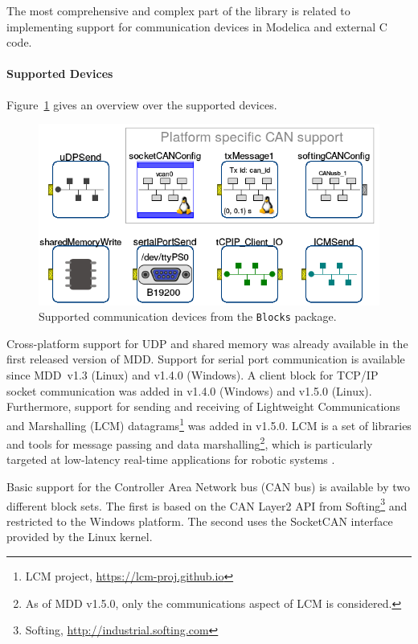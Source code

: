 \documentclass{resources/modelica}
\newcommand{\modelica}[1]{\lstinline[language=modelica]|#1|}
\begin{document}
The most comprehensive and complex part of the library is related to
implementing support for communication devices in Modelica and external
C code.

\paragraph{Supported Devices}

Figure~\ref{fig:OverviewCommunicationDevices} gives an overview over the
supported devices.
\begin{figure}[htb]
  \centering
  \includegraphics[width=0.9\columnwidth]{figures/OverviewCommunicationDevices}
  \caption{Supported communication devices from the \modelica{Blocks} package.}
  \label{fig:OverviewCommunicationDevices}
\end{figure}

\noindent
Cross-platform support for UDP and shared memory was already
available in the first released version of MDD. Support for serial port communication is
available since MDD~v1.3 (Linux) and v1.4.0 (Windows). A client block for TCP/IP
socket communication was added in v1.4.0 (Windows) and v1.5.0 (Linux).
Furthermore, support for sending and receiving of Lightweight Communications and
Marshalling (LCM) datagrams\footnote{LCM project,
\url{https://lcm-proj.github.io}} was added in v1.5.0.
LCM is a set of libraries and tools for message passing and data marshalling\footnote{As of MDD
v1.5.0, only the communications aspect of LCM is considered.},
which is particularly targeted at low-latency real-time applications for
robotic systems \citep{Huang2010}.

Basic support for the Controller Area Network bus (CAN bus) is available by two
different block sets. The first is based on the CAN Layer2 API from
Softing\footnote{Softing, \url{http://industrial.softing.com}} and restricted to the
Windows platform. The second uses the SocketCAN
interface provided by the Linux kernel.
\end{document}
